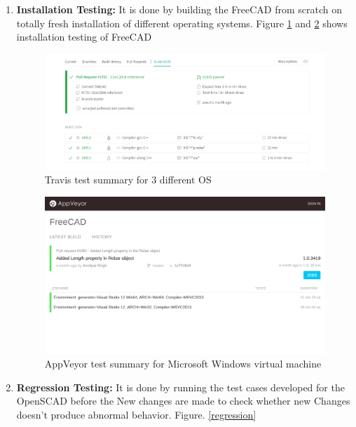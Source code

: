  \begin{enumerate}
     \item \textbf{Installation Testing:} It is done by building the FreeCAD from scratch on totally fresh installation of different operating systems. Figure \ref{fig:travis} and \ref{appveyor} shows installation testing of FreeCAD
   
     \begin{figure}
         \centering
         \includegraphics[width=\linewidth]{images/travis.png}
         \caption{Travis test summary for 3 different OS}
         \label{fig:travis}
     \end{figure}
     \begin{figure}
         \centering
         \includegraphics[width=\linewidth]{images/appveyor.png}
         \caption{AppVeyor test summary for Microsoft Windows virtual machine}
         \label{appveyor}
     \end{figure}
   
     \item \textbf{Regression Testing:} It is done by running the test cases developed for the OpenSCAD before the New changes are made to check whether new Changes doesn't produce abnormal behavior. Figure. \ref{regression}
   

\end{enumerate}
